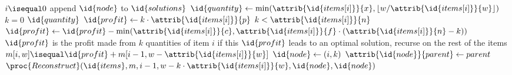 \documentclass{article}
\newcommand{\floor}[1]{\left\lfloor #1 \right\rfloor}
\newcommand{\itemattr}[1]{\attrib{\id{items[i]}}{#1}}
\begin{document}
\begin{codebox}
\li \If $i \isequal 0$ \Then
\li 	append $\id{node}$ to $\id{solutions}$
\li	\Else
\li		$\id{quantity} \gets \min(\itemattr{x}, \floor{w/\itemattr{w}})$
\li \For $k = 0$ \To $\id{quantity}$ \Do
\li 	$\id{profit} \gets k \cdot \itemattr{p}$
\li 	\If $k < \itemattr{n}$ \Then
\li 		$\id{profit} \gets \id{profit} - \min(\itemattr{c}, \itemattr{f} \cdot (\itemattr{n} - k))$
		\End
\li 	\Comment $\id{profit}$ is the profit made from $k$ quantities of item $i$
\li 	\Comment if this $\id{profit}$ leads to an optimal solution, recurse on the rest of the items
\li \If $m[i, w] \isequal \id{profit} + m[i-1, w-\itemattr{w}]$ \Then
\li		$\id{node} \gets (i, k)$
\li 	$\attrib{\id{node}}{parent} \gets parent$
\li 	$\proc{Reconstruct}(\id{items}, m, i-1, w-k \cdot \itemattr{w}, \id{node}, \id{node})$


\end{codebox}
\end{document}
